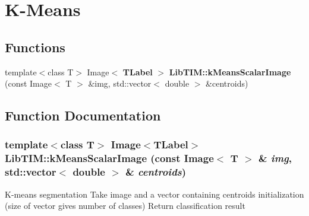 \section{K-Means}
\label{group__kMeans}
\subsection*{Functions}
\begin{CompactItemize}
\item 
template$<$class T$>$ Image$<$ {\bf TLabel} $>$ {\bf Lib\-TIM::k\-Means\-Scalar\-Image} (const Image$<$ T $>$ \&img, std::vector$<$ double $>$ \&centroids)
\end{CompactItemize}


\subsection{Function Documentation}
\subsubsection{\setlength{\rightskip}{0pt plus 5cm}template$<$class T$>$ Image$<${\bf TLabel}$>$ Lib\-TIM::k\-Means\-Scalar\-Image (const Image$<$ T $>$ \& {\em img}, std::vector$<$ double $>$ \& {\em centroids})}\label{group__kMeans_ga0}


K-means segmentation Take image and a vector containing centroids initialization (size of vector gives number of classes) Return classification result 